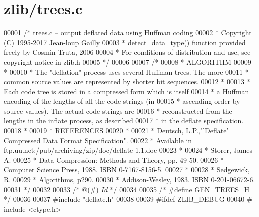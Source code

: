 \hypertarget{zlib_2trees_8c_source}{}\section{zlib/trees.c}
\label{zlib_2trees_8c_source}

\begin{DoxyCode}
00001 \textcolor{comment}{/* trees.c -- output deflated data using Huffman coding}
00002 \textcolor{comment}{ * Copyright (C) 1995-2017 Jean-loup Gailly}
00003 \textcolor{comment}{ * detect\_data\_type() function provided freely by Cosmin Truta, 2006}
00004 \textcolor{comment}{ * For conditions of distribution and use, see copyright notice in zlib.h}
00005 \textcolor{comment}{ */}
00006 
00007 \textcolor{comment}{/*}
00008 \textcolor{comment}{ *  ALGORITHM}
00009 \textcolor{comment}{ *}
00010 \textcolor{comment}{ *      The "deflation" process uses several Huffman trees. The more}
00011 \textcolor{comment}{ *      common source values are represented by shorter bit sequences.}
00012 \textcolor{comment}{ *}
00013 \textcolor{comment}{ *      Each code tree is stored in a compressed form which is itself}
00014 \textcolor{comment}{ * a Huffman encoding of the lengths of all the code strings (in}
00015 \textcolor{comment}{ * ascending order by source values).  The actual code strings are}
00016 \textcolor{comment}{ * reconstructed from the lengths in the inflate process, as described}
00017 \textcolor{comment}{ * in the deflate specification.}
00018 \textcolor{comment}{ *}
00019 \textcolor{comment}{ *  REFERENCES}
00020 \textcolor{comment}{ *}
00021 \textcolor{comment}{ *      Deutsch, L.P.,"'Deflate' Compressed Data Format Specification".}
00022 \textcolor{comment}{ *      Available in ftp.uu.net:/pub/archiving/zip/doc/deflate-1.1.doc}
00023 \textcolor{comment}{ *}
00024 \textcolor{comment}{ *      Storer, James A.}
00025 \textcolor{comment}{ *          Data Compression:  Methods and Theory, pp. 49-50.}
00026 \textcolor{comment}{ *          Computer Science Press, 1988.  ISBN 0-7167-8156-5.}
00027 \textcolor{comment}{ *}
00028 \textcolor{comment}{ *      Sedgewick, R.}
00029 \textcolor{comment}{ *          Algorithms, p290.}
00030 \textcolor{comment}{ *          Addison-Wesley, 1983. ISBN 0-201-06672-6.}
00031 \textcolor{comment}{ */}
00032 
00033 \textcolor{comment}{/* @(#) $Id$ */}
00034 
00035 \textcolor{comment}{/* #define GEN\_TREES\_H */}
00036 
00037 \textcolor{preprocessor}{#include "deflate.h"}
00038 
00039 \textcolor{preprocessor}{#ifdef ZLIB\_DEBUG}
00040 \textcolor{preprocessor}{#  include <ctype.h>}

\end{DoxyCode}
